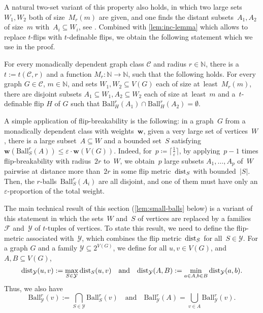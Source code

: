 \documentclass[a4paper,UKenglish,cleveref, autoref, thm-restate]{lipics-v2021}
\newcommand{\eps}{\varepsilon}
\newcommand{\YY}{\mathcal{Y}}
\newcommand{\N}[0]{\mathrm{\mathbb{N}}}
\renewcommand{\subset}{\subseteq}
\newcommand{\dist}{\textnormal{dist}}
\newcommand{\ceil}[1]{\lceil #1 \rceil}
\newcommand{\weight}{\mathbf{w}}
\newcommand{\CC}{\mathcal{C}}
\newcommand{\FF}{\mathcal{F}}
\renewcommand{\le}{\leqslant}
\newcommand{\Ball}{\mathrm{Ball}}
\begin{document}
A natural two-set variant of this property also holds,
in which two large sets~$W_1,W_2$ both of size~$M_r(m)$ are given, and one finds the distant subsets~$A_1,A_2$ of size~$m$ with~$A_i \subseteq W_i$, see \cite[full version, Theorem~19.14]{flip-breakability}.
Combined with \cref{lem:inc-lemma} which allows to replace $t$-flips with $t$-definable flips,
we obtain the following statement which we use in the proof.
\begin{corollary}\label{thm:flip-breakability}
    For every monadically dependent graph class $\CC$ and radius $r\in \N$, there is a~$t := t(\CC,r)$ and a function $M_r : \N \to \N$, such that the following holds.
    For every graph $G\in\CC$, $m\in\N$, and sets $W_1,W_2 \subseteq V(G)$ each of size at~least~$M_r(m)$, there are disjoint subsets $A_1 \subseteq W_1, A_2 \subseteq W_2$ each of size at~least~$m$ and a~\mbox{$t$-definable} flip $H$ of $G$ such that $\Ball_H^r(A_1) \cap \Ball_H^r(A_2) = \emptyset$.
\end{corollary}
 
A simple application of flip-breakability is the following:
in a graph~$G$ from a monadically dependent class with weights~$\weight$, given a very large set of vertices~$W$,
there is a large subset~$A \subset W$ and a bounded set~$S$ satisfying~$\weight(\Ball_S^r(A)) \le \eps \cdot \weight(V(G))$.
Indeed, for~$p \coloneqq \ceil{\frac{1}{\eps}}$, by applying~$p-1$ times flip-breakability with radius~$2r$ to~$W$,
we obtain~$p$ large subsets $A_1,\dots,A_p$ of~$W$ pairwise at distance more than~$2r$ in some flip metric~$\dist_S$ with bounded~$|S|$.
Then, the $r$-balls~$\Ball_S^r(A_i)$ are all disjoint, and one of them must have only an $\eps$-proportion of the total weight.

The main technical result of this section (\cref{lem:small-balls} below) is a variant of this statement in which the sets~$W$ and~$S$ of vertices are replaced by a families~$\FF$ and~$\YY$ of $t$-tuples of vertices.
To state this result, we need to define the flip-metric associated with~$\YY$, which combines the flip metric~$\dist_S$ for all~$S \in \YY$.
For a graph $G$ and a family $\YY \subseteq 2^{V(G)}$, we define for all $u,v\in V(G)$, and $A,B \subseteq V(G)$,
\[
    \dist_\YY(u,v) := \max_{S \in \YY} \dist_S(u,v)
    \quad
    \text{and}
    \quad
    \dist_\YY(A,B) := \min_{a\in A, b\in B} \dist_\YY(a,b).
\]
Thus, we also have
\[
    \Ball_\YY^r(v) := \bigcap_{S \in \YY} \Ball_S^r(v)
    \quad
    \text{and}
    \quad
    \Ball_\YY^r(A) = \bigcup_{v\in A} \Ball_\YY^r(v).
\]
\end{document}
